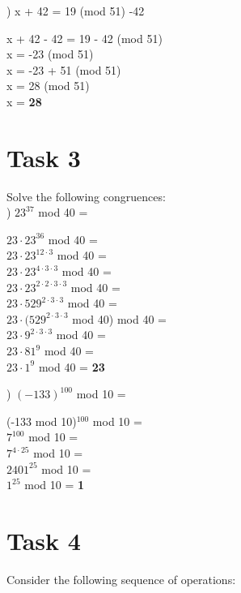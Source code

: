 \documentclass[12pt]{article}
\begin{document}
) x + 42 = 19 (mod 51) \textbar{} -42
\begin{addmargin}[1.22em]{0em}
x + 42 - 42 = 19 - 42 (mod 51) \\
x = -23 (mod 51) \\
x = -23 + 51 (mod 51) \\   
x = 28 (mod 51) \\
x = \textbf{28}
\end{addmargin}


\section*{Task 3} 

Solve the following congruences: \\

) $23^{37}$ mod 40 = 
\begin{addmargin}[1.22em]{0em}
$23 \cdot 23^{36}$ mod 40 = \\
$23 \cdot 23^{12\cdot3}$ mod 40 = \\
$23 \cdot 23^{4\cdot3\cdot3}$ mod 40 = \\
$23 \cdot 23^{2\cdot2\cdot3\cdot3}$ mod 40 = \\
$23 \cdot 529^{2\cdot3\cdot3}$ mod 40 = \\
$23 \cdot (529^{2\cdot3\cdot3}$ mod 40) mod 40 = \\
$23 \cdot 9^{2\cdot3\cdot3}$ mod 40 = \\
$23 \cdot 81^9$ mod 40 = \\
$23 \cdot 1^9$ mod 40 = 
\textbf{23}
\end{addmargin}

\pagebreak

) $(-133)^{100}$ mod 10 = 
\begin{addmargin}[1.22em]{0em}
(-133 mod 10)$^{100}$ mod 10 = \\
$7^{100}$ mod 10 = \\
$7^{4 \cdot 25}$ mod 10 = \\
$2401^{25}$ mod 10 = \\
$1^{25}$ mod 10 = 
\textbf{1}
\end{addmargin}

\section*{Task 4}

Consider the following sequence of operations: 
\\
\end{document}
